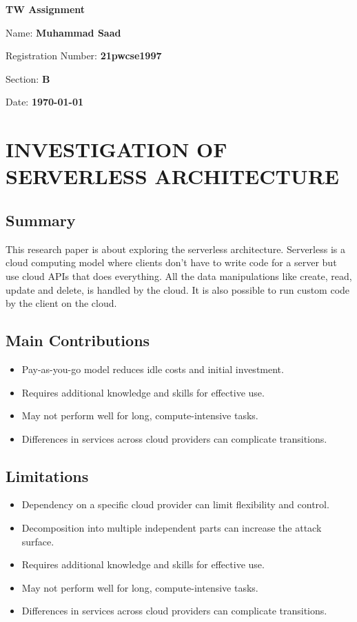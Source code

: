 \documentclass{article}
\begin{document}
\begin{titlepage}
\centering
\vspace*{6cm}
{\Large\bfseries TW Assignment \par}
\vspace{2cm}
{\Large Name: \textbf{Muhammad Saad} \par}
{\Large Registration Number: \textbf{21pwcse1997} \par}
{\Large Section: \textbf{B} \par}
\vspace{2cm}
{\Large Date: \textbf{\today} \par}
\end{titlepage}

\newpage

\section{INVESTIGATION OF SERVERLESS ARCHITECTURE}
\subsection{Summary}
This research paper is about exploring the serverless architecture. Serverless is a cloud computing model where clients don't have to write code for a server but use cloud APIs that does everything. All the data manipulations like create, read, update and delete, is handled by the cloud. It is also possible to run custom code by the client on the cloud.

\subsection{Main Contributions}
\begin{itemize}
  \item  Pay-as-you-go model reduces idle costs and initial investment.
  \item Requires additional knowledge and skills for effective use.
  \item May not perform well for long, compute-intensive tasks.
	\item  Differences in services across cloud providers can complicate transitions.
\end{itemize}

\subsection{Limitations}
\begin{itemize}
  \item Dependency on a specific cloud provider can limit flexibility and control.
  \item Decomposition into multiple independent parts can increase the attack surface.
  \item Requires additional knowledge and skills for effective use.
	\item May not perform well for long, compute-intensive tasks.
	\item Differences in services across cloud providers can complicate transitions.
\end{itemize}
\end{document}
